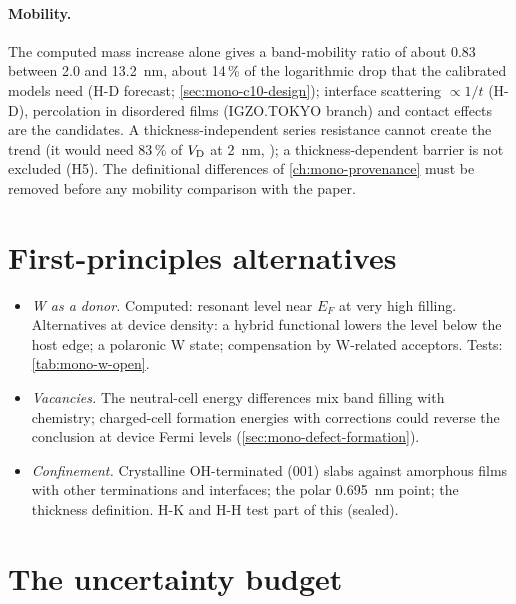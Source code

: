 \paragraph{Mobility.} The computed mass increase alone gives a band-mobility ratio of about 0.83 between 2.0 and 13.2~nm,
about 14\,\% of the logarithmic drop that the calibrated models need (H-D forecast; \cref{sec:mono-c10-design}); interface scattering $\propto1/t$ (H-D), percolation in disordered films
(IGZO.TOKYO branch) and contact effects are the candidates. A thickness-independent series resistance cannot create the
trend (it would need 83\,\% of $V_{\mathrm{D}}$ at 2~nm, ); a thickness-dependent barrier is not excluded (H5). The
definitional differences of \cref{ch:mono-provenance} must be removed before any mobility comparison with the paper.

\section{First-principles alternatives}
\label{sec:mono-alt-dft}

\begin{itemize}
\item \emph{W as a donor.} Computed: resonant level near $E_F$ at very high filling. Alternatives at device density: a
hybrid functional lowers the level below the host edge; a polaronic W state; compensation by W-related acceptors. Tests:
\cref{tab:mono-w-open}.
\item \emph{Vacancies.} The neutral-cell energy differences mix band filling with chemistry; charged-cell formation
energies with corrections could reverse the conclusion at device Fermi levels (\cref{sec:mono-defect-formation}).
\item \emph{Confinement.} Crystalline OH-terminated (001) slabs against amorphous films with other terminations and
interfaces; the polar 0.695~nm point; the thickness definition. H-K and H-H test part of this (sealed).
\end{itemize}

\section{The uncertainty budget}
\label{sec:mono-alt-budget}

